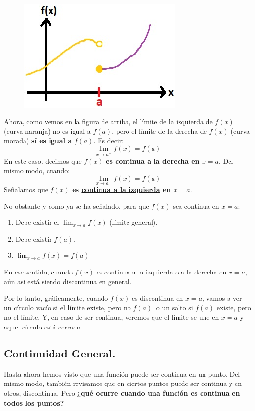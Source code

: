 \documentclass[12pt]{article}
\begin{document}
\begin{figure}[hbt!]
\centering
\includegraphics[scale=0.7]{img/continuity_plot_4.jpg}
\end{figure}

Ahora, como vemos en la figura de arriba, el límite de la izquierda de $f(x)$ (curva naranja) no es igual a $f(a)$, pero el límite de la derecha de $f(x)$ (curva morada) \textbf{sí es igual a $f(a)$}. Es decir:
\[\lim_{x \to a^{+}} f(x) = f(a)\]
En este caso, decimos que \textbf{$f(x)$ es \underline{continua a la derecha} en $x = a$}. Del mismo modo, cuando:
\[\lim_{x \to a^{-}} f(x) = f(a)\]
Señalamos que \textbf{$f(x)$ es \underline{continua a la izquierda} en $x = a$}.

No obstante y como ya se ha señalado, para que $f(x)$ sea continua en $x = a$:
\begin{enumerate}
\item Debe existir el $\lim_{x \to a} f(x)$ (límite general).
\item Debe existir $f(a)$.
\item $\lim_{x \to a} f(x) = f(a)$
\end{enumerate}

En ese sentido, cuando $f(x)$ es continua a la izquierda o a la derecha en $x = a$, aún así está siendo discontinua en general.

Por lo tanto, gráficamente, cuando $f(x)$ es discontinua en $x = a$, vamos a ver un círculo vacío si el límite existe, pero no $f(a)$; o un salto si $f(a)$ existe, pero no el límite. Y, en caso de ser continua, veremos que el límite se une en $x = a$ y aquel círculo está cerrado.


\subsection{Continuidad General.}

Hasta ahora hemos visto que una función puede ser continua en un punto. Del mismo modo, también revisamos que en ciertos puntos puede ser continua y en otros, discontinua. Pero \textbf{¿qué ocurre cuando una función es continua en todos los puntos?}
\end{document}

